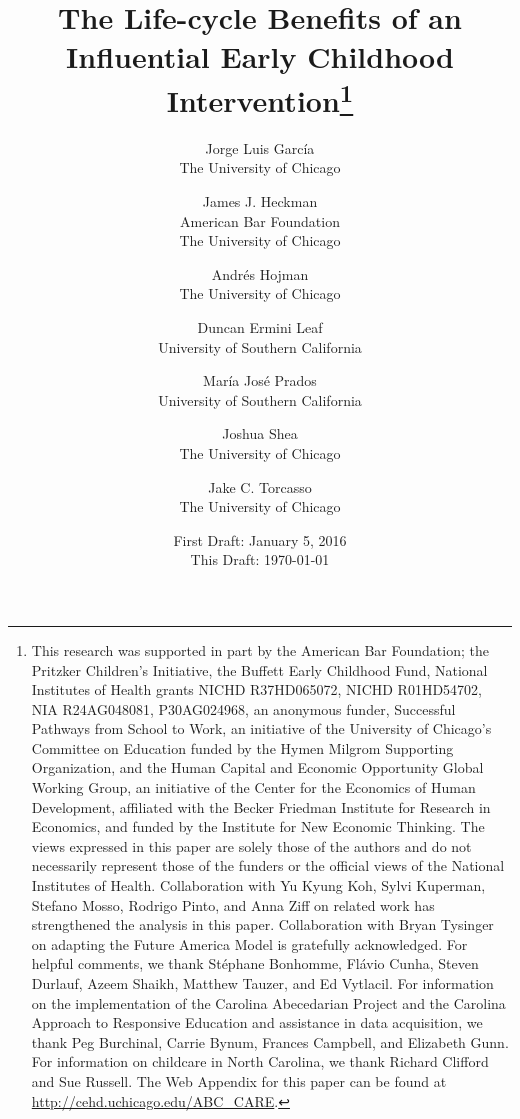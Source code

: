 


\newcommand*\leftright[2]{%
  \leavevmode
  \rlap{#1}%
  \hspace{0.5\linewidth}%
  #2}





\begin{titlepage}

\title{\Large \textbf{The Life-cycle Benefits of an Influential Early Childhood Intervention}\thanks{This research was supported in part by the American Bar Foundation; the Pritzker Children's Initiative, the Buffett Early Childhood Fund, National Institutes of Health grants NICHD R37HD065072, NICHD R01HD54702, NIA R24AG048081, P30AG024968, an anonymous funder, Successful Pathways from School to Work, an initiative of the University of Chicago's Committee on Education funded by the Hymen Milgrom Supporting Organization, and the Human Capital and Economic Opportunity Global Working Group, an initiative of the Center for the Economics of Human Development, affiliated with the Becker Friedman Institute for Research in Economics, and funded by the Institute for New Economic Thinking. The views expressed in this paper are solely those of the authors and do not necessarily represent those of the funders or the official views of the National Institutes of Health. Collaboration with Yu Kyung Koh, Sylvi Kuperman, Stefano Mosso, Rodrigo Pinto, and Anna Ziff on related work has strengthened the analysis in this paper. Collaboration with Bryan Tysinger on adapting the Future America Model is gratefully acknowledged. For helpful comments, we thank St\'{e}phane Bonhomme, Fl\'{a}vio Cunha, Steven Durlauf, Azeem Shaikh, Matthew Tauzer, and Ed Vytlacil. For information on the implementation of the Carolina Abecedarian Project and the Carolina Approach to Responsive Education and assistance in data acquisition, we thank Peg Burchinal, Carrie Bynum, Frances Campbell, and Elizabeth Gunn. For information on childcare in North Carolina, we thank Richard Clifford and Sue Russell. The Web Appendix for this paper can be found at \url{http://cehd.uchicago.edu/ABC_CARE}.}}

\author{
Jorge Luis Garc\'{i}a\\
The University of Chicago \and
James J. Heckman \\
American Bar Foundation \\
The University of Chicago \and
Andr\'{e}s Hojman\\
The University of Chicago \and
Duncan Ermini Leaf \\
University of Southern California \and
Mar\'{i}a Jos\'{e} Prados \\
University of Southern California \and
Joshua Shea \\
The University of Chicago \and
Jake C. Torcasso\\
The University of Chicago}
\date{First Draft: January 5, 2016\\ This Draft: \today}


\end{titlepage}
